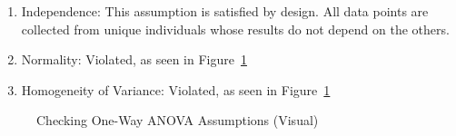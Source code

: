 \documentclass[
  letterpaper,
  DIV=11,
  numbers=noendperiod]{scrartcl}
\providecommand{\tightlist}{%
  \setlength{\itemsep}{0pt}\setlength{\parskip}{0pt}}\usepackage{longtable,booktabs,array}
\begin{document}
\begin{enumerate}
\def\labelenumi{\arabic{enumi}.}
\tightlist
\item
  Independence: This assumption is satisfied by design. All data points
  are collected from unique individuals whose results do not depend on
  the others.
\item
  Normality: Violated, as seen in Figure~\ref{fig-checks}
\item
  Homogeneity of Variance: Violated, as seen in Figure~\ref{fig-checks}
\end{enumerate}

\begin{figure}[H]


\caption{\label{fig-checks}Checking One-Way ANOVA Assumptions (Visual)}

\end{figure}%

\begin{table}

\caption{\label{tbl-checks}}


\end{table}%
\end{document}
